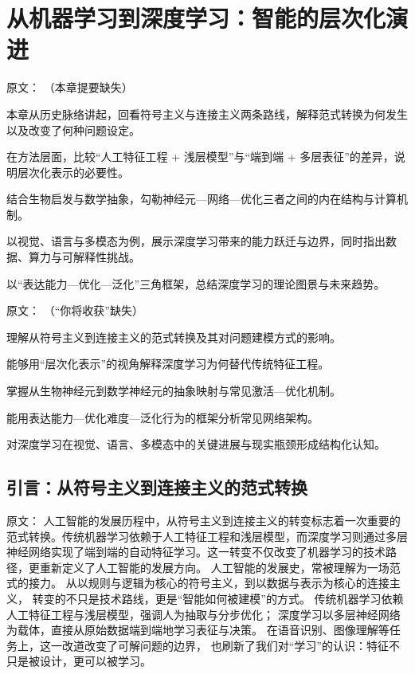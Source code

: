 \chapter{从机器学习到深度学习：智能的层次化演进}

原文：
（本章提要缺失）
\begin{introduction}
  \item 本章从历史脉络讲起，回看符号主义与连接主义两条路线，解释范式转换为何发生以及改变了何种问题设定。
  \item 在方法层面，比较“人工特征工程 + 浅层模型”与“端到端 + 多层表征”的差异，说明层次化表示的必要性。
  \item 结合生物启发与数学抽象，勾勒神经元—网络—优化三者之间的内在结构与计算机制。
  \item 以视觉、语言与多模态为例，展示深度学习带来的能力跃迁与边界，同时指出数据、算力与可解释性挑战。
  \item 以“表达能力—优化—泛化”三角框架，总结深度学习的理论图景与未来趋势。
\end{introduction}

原文：
（“你将收获”缺失）
\begin{introduction}
  \item 理解从符号主义到连接主义的范式转换及其对问题建模方式的影响。
  \item 能够用“层次化表示”的视角解释深度学习为何替代传统特征工程。
  \item 掌握从生物神经元到数学神经元的抽象映射与常见激活—优化机制。
  \item 能用表达能力—优化难度—泛化行为的框架分析常见网络架构。
  \item 对深度学习在视觉、语言、多模态中的关键进展与现实瓶颈形成结构化认知。
\end{introduction}


\section{引言：从符号主义到连接主义的范式转换}

原文：
人工智能的发展历程中，从符号主义到连接主义的转变标志着一次重要的范式转换。传统机器学习依赖于人工特征工程和浅层模型，而深度学习则通过多层神经网络实现了端到端的自动特征学习。这一转变不仅改变了机器学习的技术路径，更重新定义了人工智能的发展方向。
人工智能的发展史，常被理解为一场范式的接力。  
从以规则与逻辑为核心的符号主义，到以数据与表示为核心的连接主义，  
转变的不只是技术路线，更是“智能如何被建模”的方式。  
传统机器学习依赖人工特征工程与浅层模型，强调人为抽取与分步优化；  
深度学习以多层神经网络为载体，直接从原始数据端到端地学习表征与决策。  
在语音识别、图像理解等任务上，这一改道改变了可解问题的边界，  
也刷新了我们对“学习”的认识：特征不只是被设计，更可以被学习。

